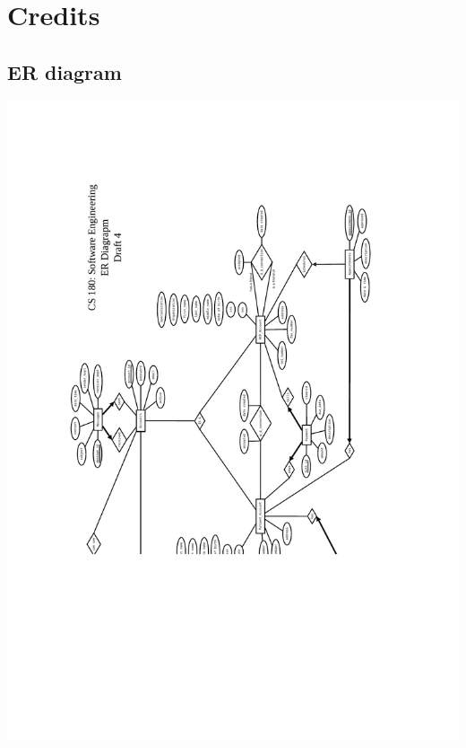 \documentclass[12pt]{report}
\begin{document}
\part{Credits}


\appendix
\chapter{ER diagram}
\includegraphics[scale=0.6]{cs180_ER_draft4.pdf}
\end{document}
